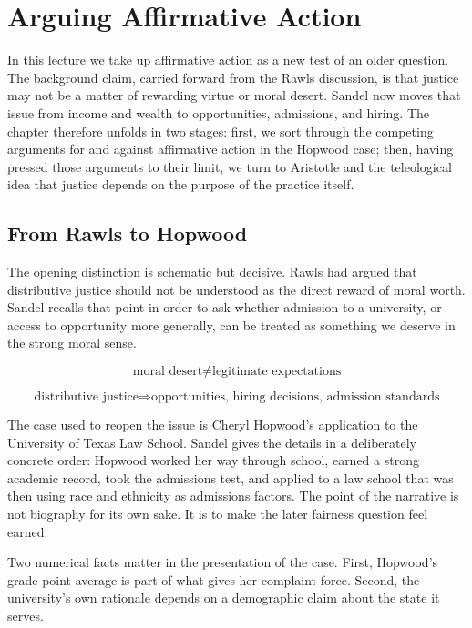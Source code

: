 \chapter{Arguing Affirmative Action}

In this lecture we take up affirmative action as a new test of an older question. The background claim, carried forward from the Rawls discussion, is that justice may not be a matter of rewarding virtue or moral desert. Sandel now moves that issue from income and wealth to opportunities, admissions, and hiring. The chapter therefore unfolds in two stages: first, we sort through the competing arguments for and against affirmative action in the Hopwood case; then, having pressed those arguments to their limit, we turn to Aristotle and the teleological idea that justice depends on the purpose of the practice itself.

\section{From Rawls to Hopwood}

The opening distinction is schematic but decisive. Rawls had argued that distributive justice should not be understood as the direct reward of moral worth. Sandel recalls that point in order to ask whether admission to a university, or access to opportunity more generally, can be treated as something we deserve in the strong moral sense.

\begin{equation}
\text{moral desert} \neq \text{legitimate expectations}
\end{equation}

\begin{equation}
\text{distributive justice}
\Longrightarrow
\text{opportunities, hiring decisions, admission standards}
\end{equation}

The case used to reopen the issue is Cheryl Hopwood's application to the University of Texas Law School. Sandel gives the details in a deliberately concrete order: Hopwood worked her way through school, earned a strong academic record, took the admissions test, and applied to a law school that was then using race and ethnicity as admissions factors. The point of the narrative is not biography for its own sake. It is to make the later fairness question feel earned.

Two numerical facts matter in the presentation of the case. First, Hopwood's grade point average is part of what gives her complaint force. Second, the university's own rationale depends on a demographic claim about the state it serves.

